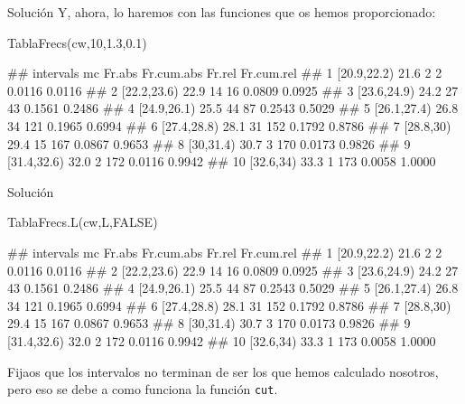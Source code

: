 \documentclass[
  ignorenonframetext,
  aspectratio=169]{beamer}
\newenvironment{Shaded}{\begin{snugshade}}{\end{snugshade}}
\newcommand{\ConstantTok}[1]{\textcolor[rgb]{0.00,0.00,0.00}{#1}}
\newcommand{\DecValTok}[1]{\textcolor[rgb]{0.00,0.00,0.81}{#1}}
\newcommand{\FloatTok}[1]{\textcolor[rgb]{0.00,0.00,0.81}{#1}}
\newcommand{\FunctionTok}[1]{\textcolor[rgb]{0.00,0.00,0.00}{#1}}
\newcommand{\NormalTok}[1]{#1}
\let\oldverbatim\verbatim
\let\endoldverbatim\endverbatim
\renewenvironment{verbatim}{\tiny\oldverbatim}{\endoldverbatim}
\begin{document}
\begin{frame}[fragile]{Solución}
\protect\hypertarget{soluciuxf3n-13}{}
Y, ahora, lo haremos con las funciones que os hemos proporcionado:

\begin{Shaded}
\begin{Highlighting}[]
\FunctionTok{TablaFrecs}\NormalTok{(cw,}\DecValTok{10}\NormalTok{,}\FloatTok{1.3}\NormalTok{,}\FloatTok{0.1}\NormalTok{)}
\end{Highlighting}
\end{Shaded}

\begin{verbatim}
##      intervals   mc Fr.abs Fr.cum.abs Fr.rel Fr.cum.rel
## 1  [20.9,22.2) 21.6      2          2 0.0116     0.0116
## 2  [22.2,23.6) 22.9     14         16 0.0809     0.0925
## 3  [23.6,24.9) 24.2     27         43 0.1561     0.2486
## 4  [24.9,26.1) 25.5     44         87 0.2543     0.5029
## 5  [26.1,27.4) 26.8     34        121 0.1965     0.6994
## 6  [27.4,28.8) 28.1     31        152 0.1792     0.8786
## 7    [28.8,30) 29.4     15        167 0.0867     0.9653
## 8    [30,31.4) 30.7      3        170 0.0173     0.9826
## 9  [31.4,32.6) 32.0      2        172 0.0116     0.9942
## 10   [32.6,34) 33.3      1        173 0.0058     1.0000
\end{verbatim}
\end{frame}

\begin{frame}[fragile]{Solución}
\protect\hypertarget{soluciuxf3n-14}{}
\begin{Shaded}
\begin{Highlighting}[]
\FunctionTok{TablaFrecs.L}\NormalTok{(cw,L,}\ConstantTok{FALSE}\NormalTok{)}
\end{Highlighting}
\end{Shaded}

\begin{verbatim}
##      intervals   mc Fr.abs Fr.cum.abs Fr.rel Fr.cum.rel
## 1  [20.9,22.2) 21.6      2          2 0.0116     0.0116
## 2  [22.2,23.6) 22.9     14         16 0.0809     0.0925
## 3  [23.6,24.9) 24.2     27         43 0.1561     0.2486
## 4  [24.9,26.1) 25.5     44         87 0.2543     0.5029
## 5  [26.1,27.4) 26.8     34        121 0.1965     0.6994
## 6  [27.4,28.8) 28.1     31        152 0.1792     0.8786
## 7    [28.8,30) 29.4     15        167 0.0867     0.9653
## 8    [30,31.4) 30.7      3        170 0.0173     0.9826
## 9  [31.4,32.6) 32.0      2        172 0.0116     0.9942
## 10   [32.6,34) 33.3      1        173 0.0058     1.0000
\end{verbatim}

Fijaos que los intervalos no terminan de ser los que hemos calculado
nosotros, pero eso se debe a como funciona la función \texttt{cut}.
\end{frame}
\end{document}

